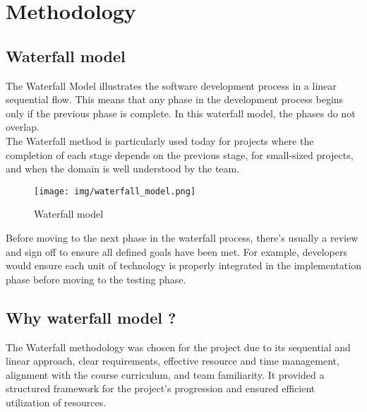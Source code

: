\section{Methodology}
\subsection{Waterfall model}
The Waterfall Model illustrates the software development process in a linear sequential flow. This means that any phase in the development process begins only if the previous phase is complete. In this waterfall model, the phases do not overlap.
\\
The Waterfall method is particularly used today for projects where the completion of each stage depends on the previous stage, for small-sized projects, and when the domain is well understood by the team.\\
\begin{figure}[H]
\centering
  \texttt{[image: img/waterfall\_model.png]}
\caption{Waterfall model}
\label{Waterfall model}      
\end{figure}
Before moving to the next phase in the waterfall process, there's usually a review and sign off to ensure all defined goals have been met. For example, developers would ensure each unit of technology is properly integrated in the implementation phase before moving to the testing phase.\\
\subsection{Why waterfall model ?}
The Waterfall methodology was chosen for the project due to its sequential and linear approach, clear requirements, effective resource and time management, alignment with the course curriculum, and team familiarity. It provided a structured framework for the project's progression and ensured efficient utilization of resources.\\
